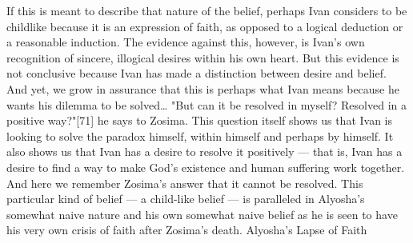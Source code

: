 If this is meant to describe that nature of the belief, perhaps Ivan considers to be childlike because it is an expression of faith, as opposed to a logical deduction or a reasonable induction. The evidence against this, however, is Ivan's own recognition of sincere, illogical desires within his own heart. But this evidence is not conclusive because Ivan has made a distinction between desire and belief. And yet, we grow in assurance that this is perhaps what Ivan means because he wants his dilemma to be solved… "But can it be resolved in myself? Resolved in a positive way?"[71] he says to Zosima. This question itself shows us that Ivan is looking to solve the paradox himself, within himself and perhaps by himself. It also shows us that Ivan has a desire to resolve it positively — that is, Ivan has a desire to find a way to make God's existence and human suffering work together. And here we remember Zosima's answer that it cannot be resolved. This particular kind of belief — a child-like belief — is paralleled in Alyosha's somewhat naive nature and his own somewhat naive belief as he is seen to have his very own crisis of faith after Zosima's death.
Alyosha’s Lapse of Faith
